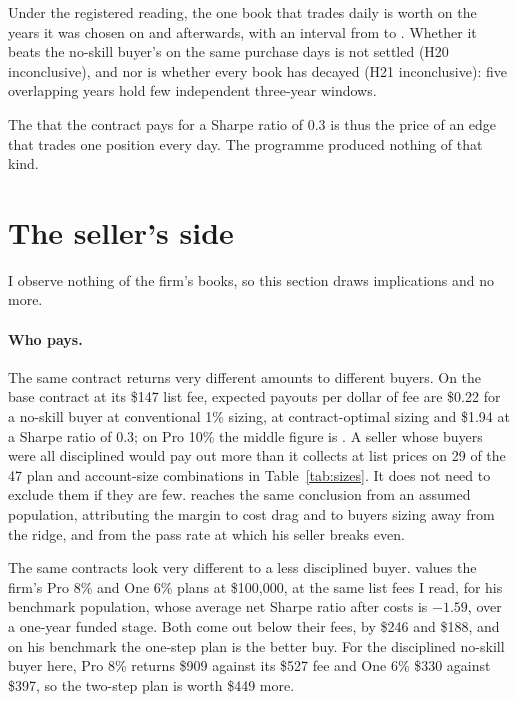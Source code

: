 \documentclass[11pt]{article}
\begin{document}
Under the registered reading, the one book that trades daily is worth \VAoneEarly{} on the years it was
chosen on and \VAoneLate{} afterwards, with an interval from \VAoneLateLo{} to \VAoneLateHi. Whether it beats the
no-skill buyer's \CoinLate{} on the same purchase days is not settled (H20 inconclusive), and nor is whether
every book has decayed (H21 inconclusive): five overlapping years hold few independent three-year windows.

The \Vskill{} that the contract pays for a Sharpe ratio of 0.3 is thus the price of an edge that trades one
position every day. The programme produced nothing of that kind.

\section{The seller's side}\label{sec:seller}
I observe nothing of the firm's books, so this section draws implications and no more.

\paragraph{Who pays.} The same contract returns very different amounts to different buyers.
On the base contract at its \$147 list fee, expected payouts per dollar of fee are \$0.22 for a no-skill buyer at
conventional 1\% sizing, \PerFeeSwing{} at contract-optimal sizing and \$1.94 at a Sharpe ratio of 0.3; on Pro
10\% the middle figure is \PerFeeProTen. A seller whose buyers were all disciplined would pay out more than it
collects at list prices on 29 of the 47 plan and account-size combinations in Table~\ref{tab:sizes}. It does not
need to exclude them if they are few. \citet{lim2026} reaches the same conclusion from an assumed population,
attributing the margin to cost drag and to buyers sizing away from the ridge, and \citet{villahermosa2026} from the
pass rate at which his seller breaks even.

The same contracts look very different to a less disciplined buyer. \citet{lim2026b} values the firm's Pro 8\% and
One 6\% plans at \$100,000, at the same list fees I read, for his benchmark population, whose average net Sharpe
ratio after costs is $-1.59$, over a one-year funded stage. Both come out below their fees, by \$246 and \$188, and
on his benchmark the one-step plan is the better buy. For the disciplined no-skill buyer here, Pro 8\% returns
\$909 against its \$527 fee and One 6\% \$330 against \$397, so the two-step plan is worth \$449 more.
\end{document}
